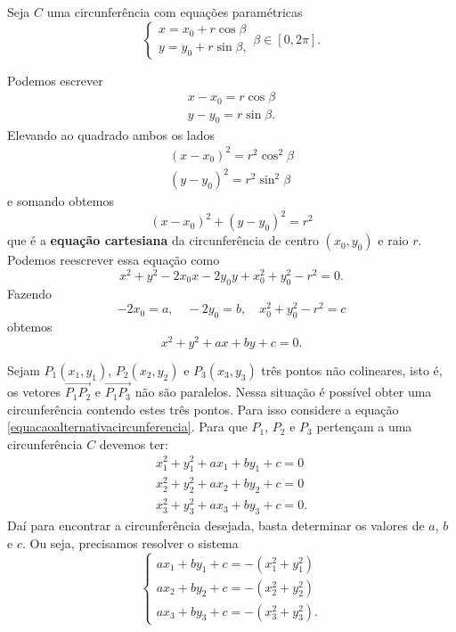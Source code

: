 Seja $C$ uma circunferência com equações paramétricas
\[
    \begin{cases}
      x = x_0 + r\cos\beta\\
      y = y_0 + r\sin\beta,
    \end{cases}
    \beta \in [0,2\pi].
\]

Podemos escrever
\begin{align*}
  x - x_0 = r\cos\beta\\
  y - y_0 = r\sin\beta.
\end{align*}
Elevando ao quadrado ambos os lados
\begin{align*}
  (x - x_0)^2 = r^2\cos^2\beta\\
  (y - y_0)^2 = r^2\sin^2\beta
\end{align*}
e somando obtemos
\begin{equation}
  (x - x_0)^2 + (y - y_0)^2 = r^2
\end{equation}
que é a \textbf{equação cartesiana} da circunferência de centro $(x_0,y_0)$ e raio $r$.
Podemos reescrever essa equação como
\[
  x^2 + y^2 - 2x_0x - 2y_0y + x_0^2 + y_0^2 - r^2 = 0.
\]
Fazendo
\[
  -2x_0 = a,\quad -2y_0 = b,\quad x_0^2 + y_0^2 - r^2 = c
\]
obtemos
\begin{equation}\label{equacaoalternativacircunferencia}
  x^2 + y^2 + ax + by + c = 0.
\end{equation}

Sejam $P_1(x_1,y_1)$, $P_2(x_2,y_2)$ e $P_3(x_3,y_3)$ três pontos não colineares, isto é, os vetores $\vec{P_1P_2}$ e $\vec{P_1P_3}$ não são paralelos. Nessa situação é possível obter uma circunferência contendo estes três pontos. Para isso considere a equação \eqref{equacaoalternativacircunferencia}. Para que $P_1$, $P_2$ e $P_3$ pertençam a uma circunferência $C$ devemos ter:
\begin{align*}
  x_1^2 + y_1^2 + ax_1 + by_1 + c = 0\\
  x_2^2 + y_2^2 + ax_2 + by_2 + c = 0\\
  x_3^2 + y_3^2 + ax_3 + by_3 + c = 0.
\end{align*}
Daí para encontrar a circunferência desejada, basta determinar os valores de $a$, $b$ e $c$. Ou seja, precisamos resolver o sistema
\[
  \begin{cases}
    ax_1 + by_1 + c = -(x_1^2 + y_1^2)\\
    ax_2 + by_2 + c = -(x_2^2 + y_2^2)\\
    ax_3 + by_3 + c = -(x_3^2 + y_3^2).
  \end{cases}
\]

